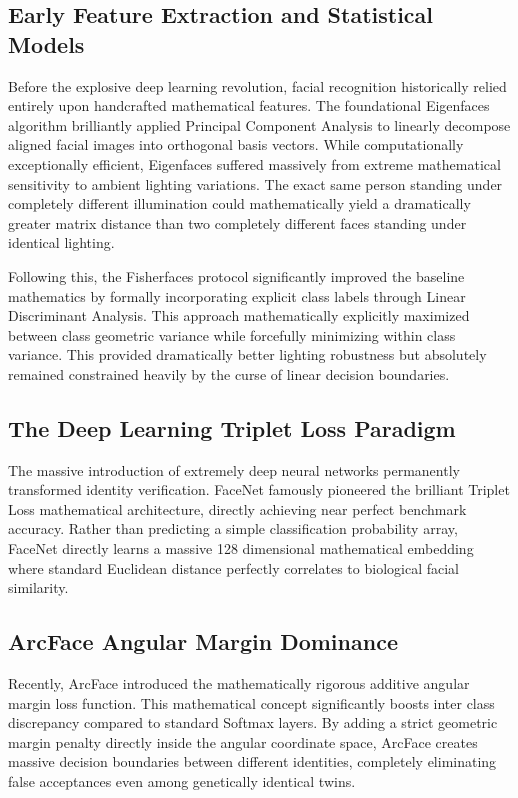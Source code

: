 \documentclass[12pt,a4paper]{report}
\begin{document}
\subsection{Early Feature Extraction and Statistical Models}
Before the explosive deep learning revolution, facial recognition historically relied entirely upon handcrafted mathematical features. The foundational Eigenfaces algorithm brilliantly applied Principal Component Analysis to linearly decompose aligned facial images into orthogonal basis vectors. While computationally exceptionally efficient, Eigenfaces suffered massively from extreme mathematical sensitivity to ambient lighting variations. The exact same person standing under completely different illumination could mathematically yield a dramatically greater matrix distance than two completely different faces standing under identical lighting.

Following this, the Fisherfaces protocol significantly improved the baseline mathematics by formally incorporating explicit class labels through Linear Discriminant Analysis. This approach mathematically explicitly maximized between class geometric variance while forcefully minimizing within class variance. This provided dramatically better lighting robustness but absolutely remained constrained heavily by the curse of linear decision boundaries.

\subsection{The Deep Learning Triplet Loss Paradigm}
The massive introduction of extremely deep neural networks permanently transformed identity verification. FaceNet famously pioneered the brilliant Triplet Loss mathematical architecture, directly achieving near perfect benchmark accuracy. Rather than predicting a simple classification probability array, FaceNet directly learns a massive 128 dimensional mathematical embedding where standard Euclidean distance perfectly correlates to biological facial similarity.

\subsection{ArcFace Angular Margin Dominance}
Recently, ArcFace introduced the mathematically rigorous additive angular margin loss function. This mathematical concept significantly boosts inter class discrepancy compared to standard Softmax layers. By adding a strict geometric margin penalty directly inside the angular coordinate space, ArcFace creates massive decision boundaries between different identities, completely eliminating false acceptances even among genetically identical twins.
\end{document}
